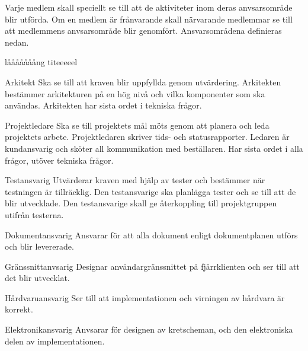 \documentclass[projektplan/plan.tex]{subfiles}
\begin{document}
Varje medlem skall speciellt se till att de aktiviteter inom deras
anvsarsområde blir utförda. Om en medlem är frånvarande skall närvarande
medlemmar se till att medlemmens anvsarsområde blir genomfört. Ansvarsområdena
definieras nedan.

\begin{labeling}{lååååååång titeeeeel}
    \item[Arkitekt] Ska se till att kraven blir uppfyllda genom utvärdering.
        Arkitekten bestämmer arkitekturen på en hög nivå och vilka komponenter
        som ska användas. Arkitekten har sista ordet i tekniska frågor.

    \item[Projektledare] Ska se till projektets mål möts genom att planera och
        leda projektets arbete. Projektledaren skriver tids- och
        statusrapporter. Ledaren är kundansvarig och sköter all kommunikation
        med beställaren. Har sista ordet i alla frågor, utöver tekniska frågor.

    \item[Testansvarig] Utvärderar kraven med hjälp av tester och bestämmer när
        testningen är tillräcklig. Den testansvarige ska planlägga tester och
        se till att de blir utvecklade. Den testansvarige skall ge återkoppling
        till projektgruppen utifrån testerna.

    \item[Dokumentansvarig] Ansvarar för att alla dokument enligt
        dokumentplanen utförs och blir levererade.

    \item[Gränssnittanvsarig] Designar användargränssnittet på fjärrklienten
        och ser till att det blir utvecklat.

    \item[Hårdvaruansvarig] Ser till att implementationen och virningen av
        hårdvara är korrekt.

    \item[Elektronikansvarig] Anvsarar för designen av kretscheman, och den
        elektroniska delen av implementationen.
\end{labeling}
\end{document}
